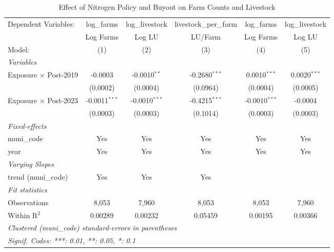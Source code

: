 
\begin{table}[htbp]
   \begin{threeparttable}
   \caption{\label{tab:main} Effect of Nitrogen Policy and Buyout on Farm Counts and Livestock}
   \centering
   \footnotesize
   \begin{tabular}{lccccc}
      \tabularnewline \midrule \midrule
      Dependent Variables:         & log\_farms      & log\_livestock  & livestock\_per\_farm   & log\_farms      & log\_livestock\\   
                                   & Log Farms       & Log LU          & LU/Farm                & Log Farms       & Log LU \\   
      Model:                       & (1)             & (2)             & (3)                    & (4)             & (5)\\  
      \midrule
      \emph{Variables}\\
      Exposure $\times$ Post-2019  & -0.0003         & -0.0010$^{**}$  & -0.2680$^{***}$        & 0.0010$^{***}$  & 0.0020$^{***}$\\   
                                   & (0.0002)        & (0.0004)        & (0.0964)               & (0.0004)        & (0.0005)\\   
      Exposure $\times$ Post-2023  & -0.0011$^{***}$ & -0.0010$^{***}$ & -0.4215$^{***}$        & -0.0010$^{***}$ & -0.0004\\   
                                   & (0.0003)        & (0.0003)        & (0.1014)               & (0.0003)        & (0.0003)\\   
      \midrule
      \emph{Fixed-effects}\\
      muni\_code                   & Yes             & Yes             & Yes                    & Yes             & Yes\\  
      year                         & Yes             & Yes             & Yes                    & Yes             & Yes\\  
      \midrule
      \emph{Varying Slopes}\\
      trend (muni\_code)           & Yes             & Yes             & Yes                    &                 & \\  
      \midrule
      \emph{Fit statistics}\\
      Observations                 & 8,053           & 7,960           & 8,053                  & 8,053           & 7,960\\  
      Within R$^2$                 & 0.00289         & 0.00232         & 0.05459                & 0.00195         & 0.00366\\  
      \midrule \midrule
      \multicolumn{6}{l}{\emph{Clustered (muni\_code) standard-errors in parentheses}}\\
      \multicolumn{6}{l}{\emph{Signif. Codes: ***: 0.01, **: 0.05, *: 0.1}}\\
   \end{tabular}
   

\end{threeparttable}
\end{table}
